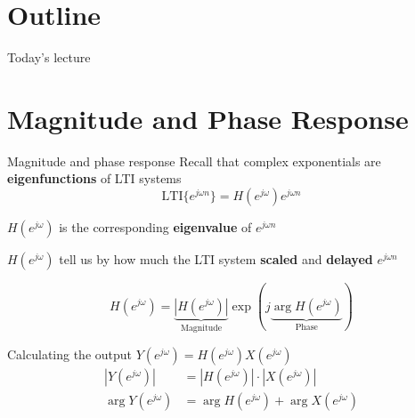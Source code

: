 \documentclass[10pt]{beamer}
\begin{document}
\section{Outline}
%
\begin{frame}{Today's lecture}
\tableofcontents
\end{frame}

%
\section{Magnitude and Phase Response}
\begin{frame}{Magnitude and phase response}
Recall that complex exponentials are \textbf{eigenfunctions} of LTI systems
\begin{equation*}
\mathrm{LTI}\{e^{j\omega n}\} = H(e^{j\omega})e^{j\omega n}
\end{equation*}

$H(e^{j\omega})$ is the corresponding \textbf{eigenvalue} of $e^{j\omega n}$

$H(e^{j\omega})$ tell us by how much the LTI system \textbf{scaled} and \textbf{delayed} $e^{j\omega n}$

\begin{equation*}
H(e^{j\omega}) = \underbrace{|H(e^{j\omega})|}_{\text{Magnitude}}\exp(j\underbrace{\arg H(e^{j\omega})}_{\text{Phase}}) \tag{polar coordinates}
\end{equation*}

\pause
Calculating the output $Y(e^{j\omega}) = H(e^{j\omega})X(e^{j\omega})$
\begin{align*}
|Y(e^{j\omega})| &= |H(e^{j\omega})|\cdot|X(e^{j\omega})| \tag{magnitudes multiply} \\ 
\arg Y(e^{j\omega}) &= \arg H(e^{j\omega}) + \arg X(e^{j\omega}) \tag{phases add}
\end{align*} 
\end{frame}
\end{document}
